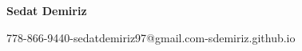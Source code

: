 \documentclass{subfiles}
\begin{document}
\begin{minipage}[t]{1\textwidth} 
  \centering \Huge 
  \textbf{Sedat Demiriz} \vspace{.5em} 
\end{minipage}
\begin{minipage}[t]{1\textwidth} 
  \centering \normalsize 
  778-866-9440\hspace{0.5em}-\hspace{0.5em}sedatdemiriz97@gmail.com\hspace{0.5em}-\hspace{0.5em}sdemiriz.github.io
\end{minipage}
\end{document}
